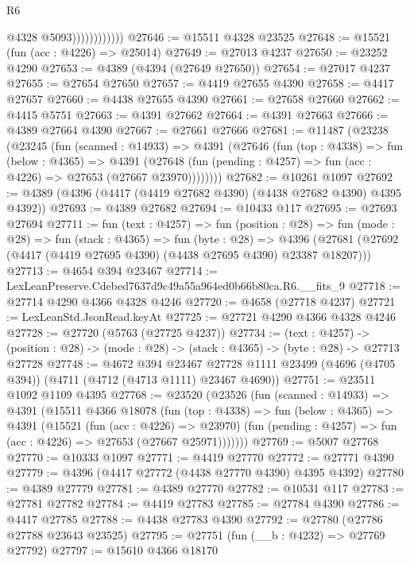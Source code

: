 \begin{lexlean}{R6}
\begin{coremodule}
                            @4328
                            @5093))))))))))))
@27646 := @15511 @4328 @23525
@27648 := @15521 (fun (acc : @4226) => @25014)
@27649 := @27013 @4237
@27650 := @23252 @4290
@27653 := @4389 (@4394 (@27649 @27650))
@27654 := @27017 @4237
@27655 := @27654 @27650
@27657 := @4419 @27655 @4390
@27658 := @4417 @27657
@27660 := @4438 @27655 @4390
@27661 := @27658 @27660
@27662 := @4415 @5751
@27663 := @4391 @27662
@27664 := @4391 @27663
@27666 := @4389 @27664 @4390
@27667 := @27661 @27666
@27681 := @11487
    (@23238
      (@23245
        (fun (scanned : @14933) =>
        @4391
          (@27646
            (fun (top : @4338) =>
            fun (below : @4365) =>
            @4391
              (@27648 (fun (pending : @4257) => fun (acc : @4226) => @27653 (@27667 @23970))))))))
@27682 := @10261 @1097
@27692 := @4389 (@4396 (@4417 (@4419 @27682 @4390) (@4438 @27682 @4390) @4395 @4392))
@27693 := @4389 @27682
@27694 := @10433 @117
@27695 := @27693 @27694
@27711 := fun (text : @4257) =>
  fun (position : @28) =>
  fun (mode : @28) =>
  fun (stack : @4365) =>
  fun (byte : @28) =>
  @4396 (@27681 (@27692 (@4417 (@4419 @27695 @4390) (@4438 @27695 @4390) @23387 @18207)))
@27713 := @4654 @394 @23467
@27714 := LexLeanPreserve.Cdebed7637d9c49a55a964ed0b66b80ca.R6.__fits_9
@27718 := @27714 @4290 @4366 @4328 @4246
@27720 := @4658 (@27718 @4237)
@27721 := LexLeanStd.JsonRead.keyAt
@27725 := @27721 @4290 @4366 @4328 @4246
@27728 := @27720 (@5763 (@27725 @4237))
@27734 := (text : @4257) ->
  (position : @28) -> (mode : @28) -> (stack : @4365) -> (byte : @28) -> @27713 @27728
@27748 := @4672
    @394
    @23467
    @27728
    @1111
    @23499
    (@4696 (@4705 @394))
    (@4711 (@4712 (@4713 @1111) @23467 @4690))
@27751 := @23511 @1092 @1109 @4395
@27768 := @23520
    (@23526
      (fun (scanned : @14933) =>
      @4391
        (@15511
          @4366
          @18078
          (fun (top : @4338) =>
          fun (below : @4365) =>
          @4391
            (@15521
              (fun (acc : @4226) => @23970)
              (fun (pending : @4257) => fun (acc : @4226) => @27653 (@27667 @25971)))))))
@27769 := @5007 @27768
@27770 := @10333 @1097
@27771 := @4419 @27770
@27772 := @27771 @4390
@27779 := @4396 (@4417 @27772 (@4438 @27770 @4390) @4395 @4392)
@27780 := @4389 @27779
@27781 := @4389 @27770
@27782 := @10531 @117
@27783 := @27781 @27782
@27784 := @4419 @27783
@27785 := @27784 @4390
@27786 := @4417 @27785
@27788 := @4438 @27783 @4390
@27792 := @27780 (@27786 @27788 @23643 @23525)
@27795 := @27751 (fun (__b : @4232) => @27769 @27792)
@27797 := @15610 @4366 @18170

\end{coremodule}
\end{lexlean}
